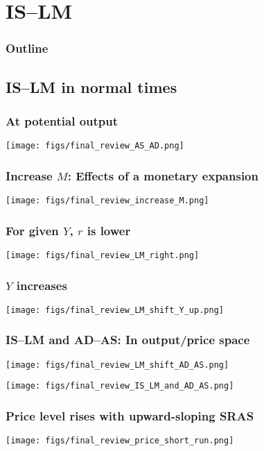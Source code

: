 \documentclass[presentation,dvipsnames]{beamer}
\begin{document}
\section{IS--LM}

\begin{frame}
\frametitle{Outline}
\tableofcontents[currentsection]
\end{frame}

\subsection{IS--LM in normal times}
\label{sec-5}

\begin{frame}
\frametitle{At potential output}
\centerline{\texttt{[image: figs/final\_review\_AS\_AD.png]}}
\end{frame}

\begin{frame}
\frametitle{Increase $M$: Effects of a monetary expansion}
\centerline{\texttt{[image: figs/final\_review\_increase\_M.png]}}
\end{frame}

\begin{frame}
\frametitle{For given $Y$, $r$ is lower}
\centerline{\texttt{[image: figs/final\_review\_LM\_right.png]}}
\end{frame}

\begin{frame}
\frametitle{$Y$ increases}
\centerline{\texttt{[image: figs/final\_review\_LM\_shift\_Y\_up.png]}}
\end{frame}

\begin{frame}
\frametitle{IS--LM and AD--AS: In output/price space}
\centerline{\texttt{[image: figs/final\_review\_LM\_shift\_AD\_AS.png]}}
\end{frame}

\begin{frame}
\centerline{\texttt{[image: figs/final\_review\_IS\_LM\_and\_AD\_AS.png]}}
\end{frame}

\begin{frame}
\frametitle{Price level rises with upward-sloping SRAS}
\centerline{\texttt{[image: figs/final\_review\_price\_short\_run.png]}}
\end{frame}
\end{document}
